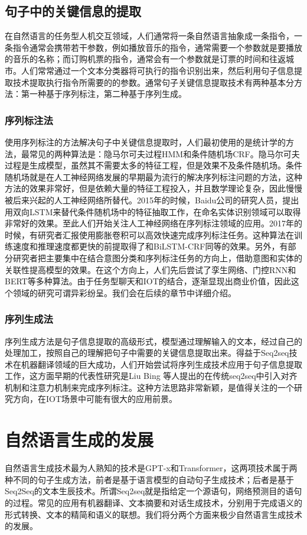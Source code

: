 \documentclass[twoside,a4paper,12pt]{book}%
\begin{document}
\subsection{句子中的关键信息的提取}

在自然语言的任务型人机交互领域，人们通常将一条自然语言抽象成一条指令，一条指令通常会携带若干参数，例如播放音乐的指令，通常需要一个参数就是要播放的音乐的名称；而订购机票的指令，通常会有一个参数就是订票的时间和往返城市。人们常常通过一个文本分类器将可执行的指令识别出来，然后利用句子信息提取技术提取执行指令所需要的的参数。通常句子关键信息提取技术有两种基本分方法：第一种基于序列标注，第二种基于序列生成。
\subsubsection{序列标注法}
使用序列标注的方法解决句子中关键信息提取时，人们最初使用的是统计学的方法，最常见的两种算法是：隐马尔可夫过程\gls{HMM}和条件随机场\gls{CRF}。隐马尔可夫过程是生成模型，虽然其不需要太多的特征工程，但是效果不及条件随机场。条件随机场就是在人工神经网络发展的早期最为流行的解决序列标注问题的方法，这种方法的效果非常好，但是依赖大量的特征工程投入，并且数学理论复杂，因此慢慢被后来兴起的人工神经网络所替代。2015年的时候，Baidu公司的研究人员，提出用双向\gls{LSTM}来替代条件随机场中的特征抽取工作，在命名实体识别领域可以取得非常好的效果。至此人们开始关注人工神经网络在序列标注领域的应用。2017年的时候，有研究者汇报使用膨胀卷积可以高效快速完成序列标注任务。这种算法在训练速度和推理速度都更快的前提取得了和BiLSTM-\gls{CRF}同等的效果。另外，有部分研究者把主要集中在结合意图分类和序列标注任务的方向上，借助意图和实体的关联性提高模型的效果。在这个方向上，人们先后尝试了孪生网络、门控\gls{RNN}和\gls{BERT}等多种算法。由于任务型聊天和IOT的结合，逐渐显现出商业价值，因此这个领域的研究可谓异彩纷呈。我们会在后续的章节中详细介绍。
\subsubsection{序列生成法}
序列生成方法是句子信息提取的高级形式，模型通过理解输入的文本，经过自己的处理加工，按照自己的理解把句子中需要的关键信息提取出来。得益于Seq2seq技术在机器翻译领域的巨大成功，人们开始尝试将序列生成技术应用于句子信息提取工作，这方面早期的代表性研究是Liu Bing 等人提出的在传统seq2seq中引入对齐机制和注意力机制来完成序列标注。这种方法思路非常新颖，是值得关注的一个研究方向，在IOT场景中可能有很大的应用前景。
\section{自然语言生成的发展}
自然语言生成技术最为人熟知的技术是\gls{GPT}-x和Transformer，这两项技术属于两种不同的句子生成方法，前者是基于语言模型的自动句子生成技术；后者是基于Seq2Seq的文本生辰技术。所谓Seq2seq就是指给定一个源语句，网络预测目的语句的过程。常见的应用有机器翻译、文本摘要和对话生成技术，分别用于完成语义的形式转换、文本的精简和语义的联想。我们将分两个方面来极少自然语言生成技术的发展。
\end{document}
